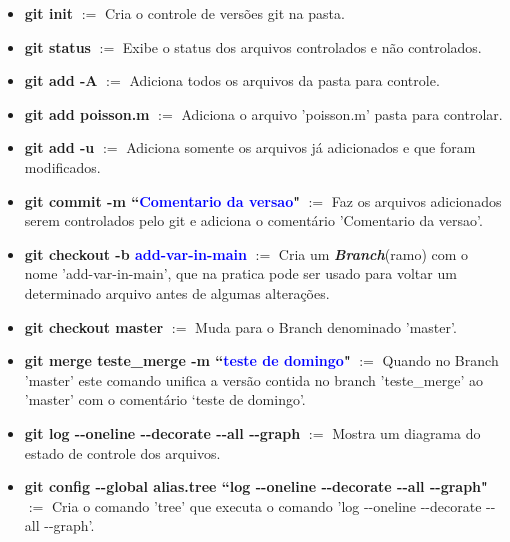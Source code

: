 \documentclass[12pt]{article}
\begin{document}
\begin{itemize}
	\item \textbf{git init} $:=$ Cria o controle de versões git na pasta.
	
	\item \textbf{git status} $:=$ Exibe o status dos arquivos controlados e não controlados.
	
	\item \textbf{git add -A} $:=$ Adiciona todos os arquivos da pasta para controle.
	
	\item \textbf{git add poisson.m} $:=$ Adiciona o arquivo 'poisson.m' pasta para controlar.
	
	\item \textbf{git add -u} $:=$ Adiciona somente os arquivos já adicionados e que foram modificados.
	
	\item \textbf{git commit -m ``\textcolor{blue}{Comentario da versao}"} $:=$ Faz os arquivos adicionados serem controlados pelo git e adiciona o comentário 'Comentario da versao'.
	
	\item \textbf{git checkout -b \textcolor{blue}{add-var-in-main}} $:=$ Cria um \textit{\textbf{Branch}}(ramo) com o nome 'add-var-in-main', que na pratica pode ser usado para voltar um determinado arquivo antes de algumas alterações. 
	
	\item \textbf{git checkout master} $:=$ Muda para o Branch denominado 'master'.
	
	\item \textbf{git merge teste\_merge -m ``\textcolor{blue}{teste de domingo}"} $:=$ Quando no Branch 'master' este comando unifica a versão contida no branch 'teste\_merge' ao 'master' com o comentário `teste de domingo'.
	
	\item \textbf{git log -\hspace{0.5mm}-oneline -\hspace{0.5mm}-decorate -\hspace{0.5mm}-all -\hspace{0.5mm}-graph} $:=$ Mostra um diagrama do estado de controle dos arquivos.
	
	\item \textbf{git config -\hspace{0.5mm}-global alias.tree ``log -\hspace{0.5mm}-oneline -\hspace{0.5mm}-decorate -\hspace{0.5mm}-all -\hspace{0.5mm}-graph"} $:=$ Cria o comando 'tree' que executa o comando 'log -\hspace{0.5mm}-oneline -\hspace{0.5mm}-decorate -\hspace{0.5mm}-all -\hspace{0.5mm}-graph'.
	

\end{itemize}
\end{document}

